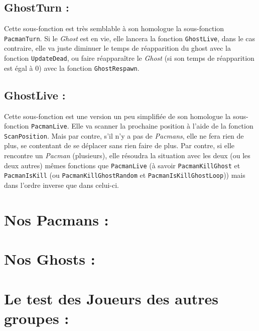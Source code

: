 \documentclass[a4paper, 11pt]{article}
\begin{document}
\subsection{GhostTurn :}

Cette sous-fonction est très semblable à son homologue la sous-fonction \texttt{PacmanTurn}.  Si le \textit{Ghost} est en vie, elle lancera la fonction \texttt{GhostLive}, dans le cas contraire, elle va juste diminuer le temps de réapparition du ghost avec la fonction \texttt{UpdateDead}, ou faire réapparaître le \textit{Ghost} (si son temps de réapparition est égal à 0) avec la fonction \texttt{GhostRespawn}.

\subsection{GhostLive :}

Cette sous-fonction est une version un peu simplifiée de son homologue la sous-fonction \texttt{PacmanLive}.  Elle va scanner la prochaine position à l'aide de la fonction \texttt{ScanPosition}.  Mais par contre, s'il n'y a pas de \textit{Pacmans}, elle ne fera rien de plus, se contentant de se déplacer sans rien faire de plus.  Par contre, si elle rencontre un \textit{Pacman} (plusieurs), elle résoudra la situation avec les deux (ou les deux autres) mêmes fonctions que \texttt{PacmanLive} (à savoir \texttt{PacmanKillGhost} et \texttt{PacmanIsKill} (ou \texttt{PacmanKillGhostRandom} et \texttt{PacmanIsKillGhostLoop})) mais dans l'ordre inverse que dans celui-ci. 

\section{Nos Pacmans :}

\section{Nos Ghosts :}

\section{Le test des Joueurs des autres groupes :}
\end{document}
